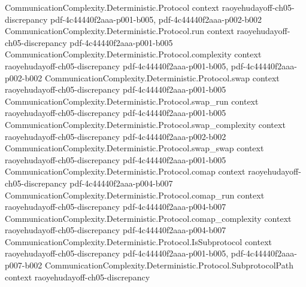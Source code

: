 \begin{lemma}
\label{CommunicationComplexity.Functions.InnerProduct.sum_sq_indicator_mul_boolSign_innerProduct_le}
\leanok
{}
\proofstep
  {CommunicationComplexity.Deterministic.Protocol}
  {context}
  {raoyehudayoff-ch05-discrepancy}
  {pdf-4c44440f2aaa-p001-b005,
    pdf-4c44440f2aaa-p002-b002}
\proofstep
  {CommunicationComplexity.Deterministic.Protocol.run}
  {context}
  {raoyehudayoff-ch05-discrepancy}
  {pdf-4c44440f2aaa-p001-b005}
\proofstep
  {CommunicationComplexity.Deterministic.Protocol.complexity}
  {context}
  {raoyehudayoff-ch05-discrepancy}
  {pdf-4c44440f2aaa-p001-b005,
    pdf-4c44440f2aaa-p002-b002}
\proofstep
  {CommunicationComplexity.Deterministic.Protocol.swap}
  {context}
  {raoyehudayoff-ch05-discrepancy}
  {pdf-4c44440f2aaa-p001-b005}
\proofstep
  {CommunicationComplexity.Deterministic.Protocol.swap_run}
  {context}
  {raoyehudayoff-ch05-discrepancy}
  {pdf-4c44440f2aaa-p001-b005}
\proofstep
  {CommunicationComplexity.Deterministic.Protocol.swap_complexity}
  {context}
  {raoyehudayoff-ch05-discrepancy}
  {pdf-4c44440f2aaa-p002-b002}
\proofstep
  {CommunicationComplexity.Deterministic.Protocol.swap_swap}
  {context}
  {raoyehudayoff-ch05-discrepancy}
  {pdf-4c44440f2aaa-p001-b005}
\proofstep
  {CommunicationComplexity.Deterministic.Protocol.comap}
  {context}
  {raoyehudayoff-ch05-discrepancy}
  {pdf-4c44440f2aaa-p004-b007}
\proofstep
  {CommunicationComplexity.Deterministic.Protocol.comap_run}
  {context}
  {raoyehudayoff-ch05-discrepancy}
  {pdf-4c44440f2aaa-p004-b007}
\proofstep
  {CommunicationComplexity.Deterministic.Protocol.comap_complexity}
  {context}
  {raoyehudayoff-ch05-discrepancy}
  {pdf-4c44440f2aaa-p004-b007}
\proofstep
  {CommunicationComplexity.Deterministic.Protocol.IsSubprotocol}
  {context}
  {raoyehudayoff-ch05-discrepancy}
  {pdf-4c44440f2aaa-p001-b005,
    pdf-4c44440f2aaa-p007-b002}
\proofstep
  {CommunicationComplexity.Deterministic.Protocol.SubprotocolPath}
  {context}
  {raoyehudayoff-ch05-discrepancy}

\end{lemma}
